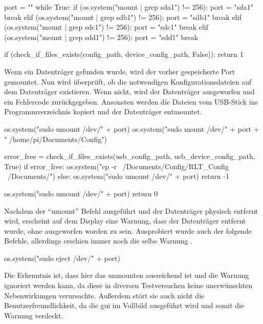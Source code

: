 \begin{pythoncode}
	port = ""
	while True:
		if (os.system("mount | grep sda1") != 256):
			port = "sda1"
			break
		elif (os.system("mount | grep sdb1") != 256):
			port = "sdb1"
			break
		elif (os.system("mount | grep sdc1") != 256):
			port = "sdc1"
			break
		elif (os.system("mount | grep sdd1") != 256):
			port = "sdd1"
			break
		
		if (check_if_files_exists(config_path, device_config_path, False)):
			return 1
\end{pythoncode}

Wenn ein Datenträger gefunden wurde, wird der vorher gespeicherte Port gemountet. Nun wird überprüft, ob die notwendigen Konfigurationsdateien auf dem Datenträger existieren. Wenn nicht, wird der Datenträger ausgeworfen und ein Fehlercode zurückgegeben. Ansonsten werden die Dateien vom USB-Stick ins Programmverzeichnis kopiert und der Datenträger entmountet. 
\begin{pythoncode}
	os.system("sudo umount /dev/" + port)
	os.system("sudo mount /dev/" + port + " /home/pi/Documents/Config")
	
	error_free = check_if_files_exists(usb_config_path, usb_device_config_path, True)
	if error_free:
		os.system("cp -r ~/Documents/Config/RLT_Config ~/Documents/")
	else:
		os.system("sudo umount /dev/" + port)
		return -1
		
	os.system("sudo umount /dev/" + port)
	return 0
\end{pythoncode}

Nachdem der \enquote{umount} Befehl ausgeführt und der Datenträger physisch entfernt wird, erscheint auf dem Display eine Warnung, dass der Datenträger entfernt wurde, ohne ausgeworfen worden zu sein. Ausprobiert wurde auch der folgende Befehle, allerdings erschien immer noch die selbe Warnung \cite{Totor:2022}.
\begin{pythoncode}
	os.system("sudo eject /dev/" + port)
\end{pythoncode}
Die Erkenntnis ist, dass hier das unmounten ausreichend ist und die Warnung ignoriert werden kann, da diese in diversen Testversuchen keine unerwünschten Nebenwirkungen verursachte. Außerdem stört sie auch nicht die Benutzerfreundlichkeit, da die \acs{gui} im Vollbild ausgeführt wird und somit die Warnung verdeckt.

